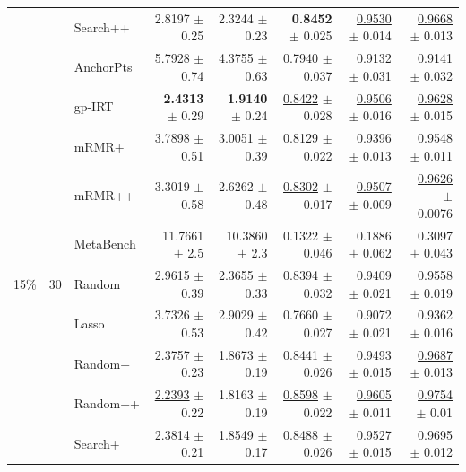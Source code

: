 \begin{longtable}{llp{}rrrrr}
 &  & Search++ & 2.8197 {\scriptsize $\pm$ 0.25} & 2.3244 {\scriptsize $\pm$ 0.23} & \textbf{0.8452} {\scriptsize $\pm$ 0.025} & \underline{0.9530} {\scriptsize $\pm$ 0.014} & \underline{0.9668} {\scriptsize $\pm$ 0.013} \\
 &  & AnchorPts & 5.7928 {\scriptsize $\pm$ 0.74} & 4.3755 {\scriptsize $\pm$ 0.63} & 0.7940 {\scriptsize $\pm$ 0.037} & 0.9132 {\scriptsize $\pm$ 0.031} & 0.9141 {\scriptsize $\pm$ 0.032} \\
 &  & gp-IRT & \textbf{2.4313} {\scriptsize $\pm$ 0.29} & \textbf{1.9140} {\scriptsize $\pm$ 0.24} & \underline{0.8422} {\scriptsize $\pm$ 0.028} & \underline{0.9506} {\scriptsize $\pm$ 0.016} & \underline{0.9628} {\scriptsize $\pm$ 0.015} \\
 &  & mRMR+ & 3.7898 {\scriptsize $\pm$ 0.51} & 3.0051 {\scriptsize $\pm$ 0.39} & 0.8129 {\scriptsize $\pm$ 0.022} & 0.9396 {\scriptsize $\pm$ 0.013} & 0.9548 {\scriptsize $\pm$ 0.011} \\
 &  & mRMR++ & 3.3019 {\scriptsize $\pm$ 0.58} & 2.6262 {\scriptsize $\pm$ 0.48} & \underline{0.8302} {\scriptsize $\pm$ 0.017} & \underline{0.9507} {\scriptsize $\pm$ 0.009} & \underline{0.9626} {\scriptsize $\pm$ 0.0076} \\
 &  & MetaBench & 11.7661 {\scriptsize $\pm$ 2.5} & 10.3860 {\scriptsize $\pm$ 2.3} & 0.1322 {\scriptsize $\pm$ 0.046} & 0.1886 {\scriptsize $\pm$ 0.062} & 0.3097 {\scriptsize $\pm$ 0.043} \\
\midrule
15\% & 30 & Random & 2.9615 {\scriptsize $\pm$ 0.39} & 2.3655 {\scriptsize $\pm$ 0.33} & 0.8394 {\scriptsize $\pm$ 0.032} & 0.9409 {\scriptsize $\pm$ 0.021} & 0.9558 {\scriptsize $\pm$ 0.019} \\
 &  & Lasso & 3.7326 {\scriptsize $\pm$ 0.53} & 2.9029 {\scriptsize $\pm$ 0.42} & 0.7660 {\scriptsize $\pm$ 0.027} & 0.9072 {\scriptsize $\pm$ 0.021} & 0.9362 {\scriptsize $\pm$ 0.016} \\
 &  & Random+ & 2.3757 {\scriptsize $\pm$ 0.23} & 1.8673 {\scriptsize $\pm$ 0.19} & 0.8441 {\scriptsize $\pm$ 0.026} & 0.9493 {\scriptsize $\pm$ 0.015} & \underline{0.9687} {\scriptsize $\pm$ 0.013} \\
 &  & Random++ & \underline{2.2393} {\scriptsize $\pm$ 0.22} & 1.8163 {\scriptsize $\pm$ 0.19} & \underline{0.8598} {\scriptsize $\pm$ 0.022} & \underline{0.9605} {\scriptsize $\pm$ 0.011} & \underline{0.9754} {\scriptsize $\pm$ 0.01} \\
 &  & Search+ & 2.3814 {\scriptsize $\pm$ 0.21} & 1.8549 {\scriptsize $\pm$ 0.17} & \underline{0.8488} {\scriptsize $\pm$ 0.026} & 0.9527 {\scriptsize $\pm$ 0.015} & \underline{0.9695} {\scriptsize $\pm$ 0.012} \\

\end{longtable}
